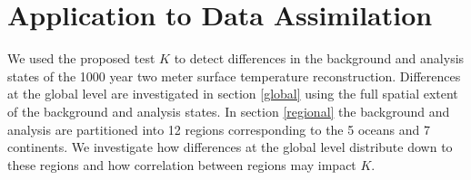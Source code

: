 \documentclass[12pt]{article}
\begin{document}






\section{Application to Data Assimilation} \label{app}

We used the proposed test $K$ to detect differences in the background and analysis states of the 1000 year two meter surface temperature reconstruction. Differences at the global level are investigated in section \ref{global} using the full spatial extent of the background and analysis states. In section \ref{regional} the background and analysis are partitioned into 12 regions corresponding to the 5 oceans and 7 continents. We investigate how differences at the global level distribute down to these regions and how correlation between regions may impact $K$.
\end{document}
